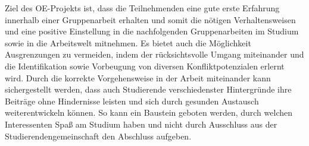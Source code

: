 \documentclass[a4paper]{article}
\begin{document}
Ziel des OE-Projekts ist, dass die Teilnehmenden eine gute erste Erfahrung innerhalb einer Gruppenarbeit erhalten und somit die nötigen Verhaltensweisen und eine positive Einstellung in die nachfolgenden Gruppenarbeiten im Studium sowie in die Arbeitswelt mitnehmen. Es bietet auch die Möglichkeit Ausgrenzungen zu vermeiden, indem der rücksichtsvolle Umgang miteinander und die Identifikation sowie Vorbeugung von diversen Konfliktpotenzialen erlernt wird. Durch die korrekte Vorgehensweise in der Arbeit miteinander kann sichergestellt werden, dass auch Studierende verschiedenster Hintergründe ihre Beiträge ohne Hindernisse leisten und sich durch gesunden Austausch weiterentwickeln können. So kann ein Baustein geboten werden, durch welchen Interessenten Spaß am Studium haben und nicht durch Ausschluss aus der Studierendengemeinschaft den Abschluss aufgeben.
\end{document}
